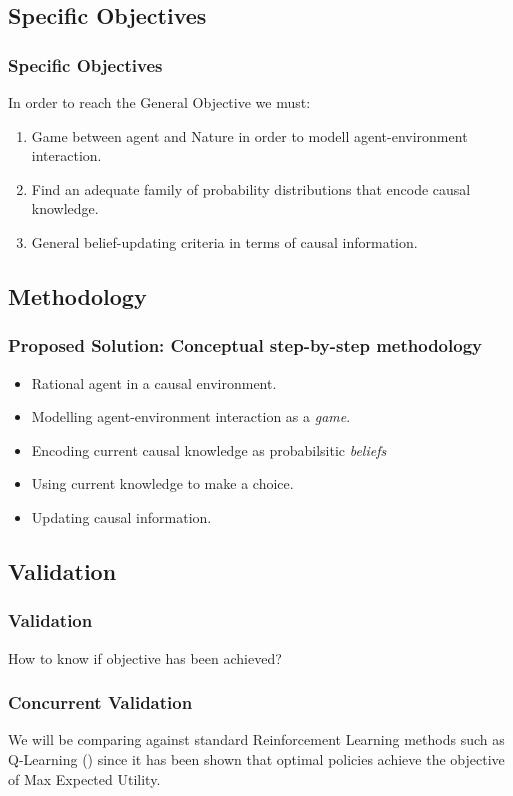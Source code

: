\documentclass{beamer}
\theoremstyle{plain}
\begin{document}
	\subsection{Specific Objectives}
	\begin{frame}
	\frametitle{Specific Objectives}
	In order to reach the General Objective we must:
	\begin{enumerate}
	\item Game between agent and Nature in order to modell agent-environment interaction.
	\item Find an adequate family of probability distributions that encode causal knowledge.
	\item General belief-updating criteria in terms of causal information.
	\end{enumerate}
	\end{frame}
	
\subsection{Methodology}
\begin{frame}
\frametitle{Proposed Solution: Conceptual step-by-step methodology}
\begin{itemize}
\item Rational agent in a causal environment.
\item Modelling agent-environment interaction as a \textit{game}.
\item Encoding current causal knowledge as probabilsitic \textit{beliefs}
\item Using current knowledge to make a choice.
\item Updating causal information.
\end{itemize}
\end{frame}

\subsection{Validation}
\begin{frame}
\frametitle{Validation}
How to know if objective has been achieved?
\end{frame}

\begin{frame}
\frametitle{Concurrent Validation}
We will be comparing against standard Reinforcement Learning methods such as Q-Learning (\cite{watkins1992q}) since it has been shown that optimal policies achieve the objective of Max Expected Utility.
\end{frame}
\end{document}

